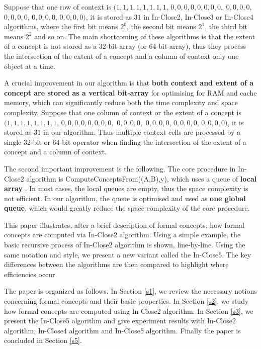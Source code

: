 \documentclass[11pt]{article}
\numberwithin{equation}{subsection}
\begin{document}
Suppose that one row of context is
$(1,1,1,1,1,1,1,1$, $0,0,0,0,0,0,0,0,$  $0,0,0,0,$  $0,0,0,0$,  $0,0,0,0$,   $0,0,0,0)$,  it is stored as $31$ in In-Close2, In-Close3 or In-Close4  algorithms, where the first bit means $2^0$, the second bit means $2^1$, the third bit means $2^2$ and so on.
The main shortcoming of these algorithms is that the extent of a concept is not stored as a 32-bit-array (or 64-bit-array), thus they process the intersection of the extent of a concept and a column of context only one object at a time.

A crucial improvement  in our algorithm is that \textbf{both context and extent of a concept are stored as a vertical bit-array} for optimising for RAM and  cache memory, which can significantly reduce both the time complexity and space complexity.
Suppose that one column of context or the extent of a concept is
$(1,1,1,1,1,1,1,1$, $0,0,0,0,0,0,0,0,$  $0,0,0,0,$  $0,0,0,0$,  $0,0,0,0$,   $0,0,0,0)$,  it is stored as $31$ in our algorithm.
Thus multiple context cells are processed by a single 32-bit or 64-bit operator when finding the intersection of the extent of a concept and a column of context.

The second important improvement is the following.
The core procedure in In-Close2 algorithm is ComputeConceptsFrom((A,B),y), which uses a queue of \textbf{local array} \cite{ Andrews11,Andrews}.
In most cases, the local queues are empty, thus the space complexity is not efficient.
In our algorithm, the queue is optimised and used  as \textbf{one global queue}, which would greatly reduce the space
complexity of the core procedure.

This paper illustrates, after a brief description of formal concepts, how formal concepts are computed via In-Close2 algorithm.
 Using a simple example, the  basic recursive process of In-Close2 algorithm is shown, line-by-line.
Using the same notation and style, we present a new variant called the In-Close5. The key differences between the algorithms are then compared to highlight where efficiencies occur.

The paper is organized as follows. In Section \ref{s1}, we review the necessary notions
concerning formal concepts and   their basic properties. In Section \ref{s2}, we study  how formal concepts are computed using In-Close2 algorithm. In Section \ref{s3}, we present the In-Close5 algorithm and give experiment results with In-Close2 algorithm, In-Close4 algorithm and In-Close5 algorithm. Finally   the paper is concluded in Section \ref{s5}.
\end{document}
